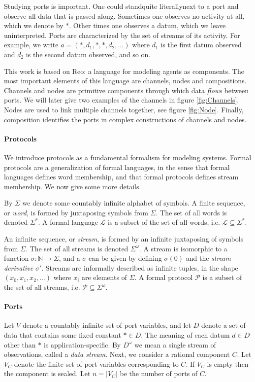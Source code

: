 Studying ports is important.
One could stand\textemdash quite literally\textemdash next to a port and observe all data that is passed along.
Sometimes one observes no activity at all, which we denote by $*$.
Other times one observes a datum, which we leave uninterpreted.
Ports are characterized by the set of streams of its activity.
For example, we write $a=(*,d_{1},*,*,d_{2},\ldots)$ where $d_{1}$ is the first datum observed and $d_{2}$ is the second datum observed, and so on.

This work is based on Reo: a language for modeling agents as components.
The most important elements of this language are channels, nodes and compositions.
Channels and nodes are primitive components through which data \emph{flows} between ports.
We will later give two examples of the channels in figure \ref{fig:Channels}.
Nodes are used to link multiple channels together, see figure \ref{fig:Node}.
Finally, composition identifies the ports in complex constructions of channels and nodes.

\paragraph{Protocols}

We introduce protocols as a fundamental formalism for modeling systems.
Formal protocols are a generalization of formal languages,
in the sense that formal languages defines word membership,
and that formal protocols defines stream membership.
We now give some more details.

By $\Sigma$ we denote some countably infinite alphabet of symbols.
A finite sequence, or \emph{word}, is formed by juxtaposing symbols from $\Sigma$.
The set of all words is denoted $\Sigma^{*}$.
A formal language $\mathcal{L}$ is a subset of the set of all words,
i.e. $\mathcal{L}\subseteq\Sigma^{*}$.

An infinite sequence, or \emph{stream}, is formed by an infinite juxtaposing of symbols from $\Sigma$.
The set of all streams is denoted $\Sigma^{\omega}$.
A stream is isomorphic to a function $\sigma:\mathbb{N}\to\Sigma$,
and a $\sigma$ can be given by defining $\sigma(0)$ and the \emph{stream derivative} $\sigma'$.
Streams are informally described as infinite tuples,
in the shape $(x_{0},x_{1},x_{2},\ldots)$ where $x_i$ are elements of $\Sigma$.
A formal protocol $\mathcal{P}$ is a subset of the set of all streams,
i.e. $\mathcal{P}\subseteq\Sigma^{\omega}$.


\paragraph{Ports} Let $V$ denote a countably infinite set of port variables,
and let $D$ denote a set of data that contains some fixed constant $*\in D$.
The meaning of each datum $d\in D$ other than $*$ is application-specific.
By $D^{\omega}$ we mean a single stream of observations, called a \emph{data stream}.
Next, we consider a rational component $C$.
Let $V_{C}$ denote the finite set of port variables corresponding to $C$.
If $V_{C}$ is empty then the component is sealed.
Let $n=|V_{C}|$ be the number of ports of $C$.

